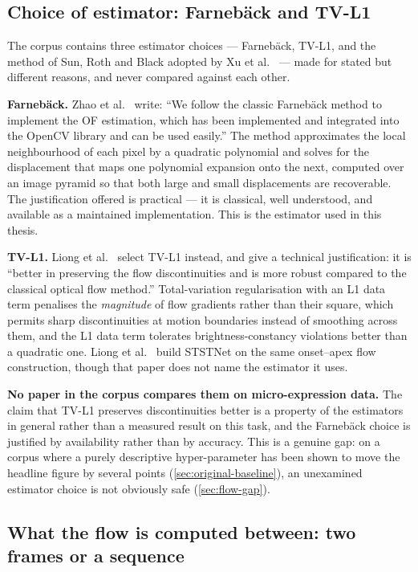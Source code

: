 \subsection{Choice of estimator: Farneb\"ack and TV-L1}
\label{sec:flow-estimator}

The corpus contains three estimator choices --- Farneb\"ack, TV-L1, and the method of Sun, Roth and Black adopted by Xu et al.~\cite{xu2017} --- made for stated but different reasons, and never compared against each other.

\textbf{Farneb\"ack.} Zhao et al.~\cite{zhaoS2021} write: ``We follow the classic Farneb\"ack method to implement the OF estimation, which has been implemented and integrated into the OpenCV library and can be used easily.'' The method approximates the local neighbourhood of each pixel by a quadratic polynomial and solves for the displacement that maps one polynomial expansion onto the next, computed over an image pyramid so that both large and small displacements are recoverable. The justification offered is practical --- it is classical, well understood, and available as a maintained implementation. This is the estimator used in this thesis.

\textbf{TV-L1.} Liong et al.~\cite{liong2019a} select TV-L1 instead, and give a technical justification: it is ``better in preserving the flow discontinuities and is more robust compared to the classical optical flow method.'' Total-variation regularisation with an L1 data term penalises the \textit{magnitude} of flow gradients rather than their square, which permits sharp discontinuities at motion boundaries instead of smoothing across them, and the L1 data term tolerates brightness-constancy violations better than a quadratic one. Liong et al.~\cite{liong2019b} build STSTNet on the same onset--apex flow construction, though that paper does not name the estimator it uses.

\textbf{No paper in the corpus compares them on micro-expression data.} The claim that TV-L1 preserves discontinuities better is a property of the estimators in general rather than a measured result on this task, and the Farneb\"ack choice is justified by availability rather than by accuracy. This is a genuine gap: on a corpus where a purely descriptive hyper-parameter has been shown to move the headline figure by several points (\autoref{sec:original-baseline}), an unexamined estimator choice is not obviously safe (\autoref{sec:flow-gap}).

\subsection{What the flow is computed between: two frames or a sequence}
\label{sec:flow-what-between}

